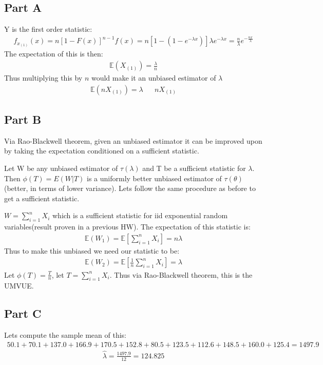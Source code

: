 \documentclass{article}
\begin{document}
\subsection*{Part A}
Y is the first order statistic:
\begin{align*}
f_{x_{(1)}}(x) = n[1-F(x)]^{n-1} f(x) = n[1-(1-e^{-\lambda x})] \lambda e^{-\lambda x} = \frac{n}{\lambda} e^{-\frac{nx}{\lambda}}
\end{align*}
The expectation of this is then:
\begin{align*}
\mathbb{E}(X_{(1)}) = \frac{\lambda}{n}
\end{align*}
Thus multiplying this by $n$ would make it an unbiased estimator of $\lambda$
\begin{align*}
\mathbb{E}(nX_{(1)}) = \lambda && \boxed{ nX_{(1)} }
\end{align*}
\subsection*{Part B}
Via Rao-Blackwell theorem, given an unbiased estimator it can be improved upon by taking the expectation conditioned on a sufficient statistic.

Let W be any unbiased estimator of $\tau(\lambda)$ and T be a sufficient
statistic for $\lambda$. Then $\phi(T) = E(W|T)$ is a uniformly better unbiased estimator of $\tau(\theta)$ (better, in terms of lower variance). Lets follow the same procedure as before to get a sufficient statistic.


$W=\sum_{i=1}^{n} X_i$ which is a sufficient statistic for iid exponential random variables(result proven in a previous HW). The expectation of this statistic is:
\begin{align*}
\mathbb{E}(W_1) =\mathbb{E}[ \sum_{i=1}^{n} X_i ] =n\lambda
\end{align*}
Thus to make this unbiased we need our statistic to be:
\begin{align*}
\mathbb{E}(W_2) =\mathbb{E}[ \frac{1}{n} \sum_{i=1}^{n} X_i ] = \lambda
\end{align*}
Let $\phi(T) = \frac{T}{n}$, let $T=\sum_{i=1}^{n} X_i$.
Thus via Rao-Blackwell theorem, this is the UMVUE.

\clearpage
\subsection*{Part C}
Lets compute the sample mean of this:
\begin{align*}
50.1+70.1+137.0+166.9+170.5+152.8+80.5+123.5+112.6+148.5+160.0+125.4 = 1497.9
\end{align*}
\begin{align*}
\boxed{ \hat{\lambda} = \frac{1497.9}{12} = 124.825 }
\end{align*}
\end{document}
